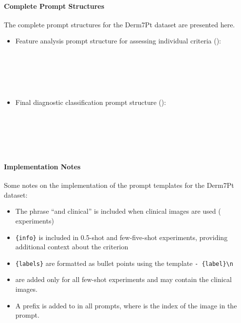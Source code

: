 \documentclass[../ShajiS_RnDReport.tex]{subfiles}
\begin{document}
\paragraph{Complete Prompt Structures}
\label{sec:appendix:prompts:derm:complete}
The complete prompt structures for the Derm7Pt dataset are presented here.

\begin{itemize}
    \item Feature analysis prompt structure for assessing individual criteria ():
    \begin{promptbox}
     \\
     \\
     \\
     \\
    \end{promptbox}

    \item Final diagnostic classification prompt structure ():
    \begin{promptbox}
     \\
     \\
     \\
     \\
    \end{promptbox}
\end{itemize}

\paragraph{Implementation Notes}
Some notes on the implementation of the prompt templates for the Derm7Pt dataset:
\begin{itemize}
    \item The phrase ``and clinical'' is included when clinical images are used ( experiments)
    \item \texttt{\{info\}} is included in 0.5-shot and few-five-shot experiments, providing additional context about the criterion
    \item \texttt{\{labels\}} are formatted as bullet points using the template \texttt{- \{label\}\textbackslash n}
    \item {} are added only for all few-shot experiments and may contain the clinical images.
    \item A prefix  is added to  in all prompts, where  is the index of the image in the prompt.
\end{itemize}
\end{document}
